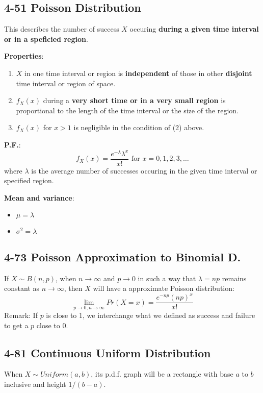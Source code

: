 \documentclass[12pt,landscape]{article}
\begin{document}
\begin{multicols}{3}
    \subsection{4-51 Poisson Distribution}
    This describes the number of success $X$ occuring \textbf{during a given time interval or in a speficied region}.

    \textbf{Properties}:
    \begin{enumerate}
        \item $X$ in one time interval or region is \textbf{independent} of those in other \textbf{disjoint} time
            interval or region of space.
        \item $f_X(x)$ during a \textbf{very short time or in a very small region} is proportional to the length
            of the time interval or the size of the region.
        \item $f_X(x)$ for $x > 1$ is negligible in the condition of (2) above.
    \end{enumerate}

    \textbf{P.F.}:
        $$ f_X(x) = \frac{e^{-\lambda}\lambda^x}{x!} \text{ for } x = 0, 1, 2, 3, \dots $$
    where $\lambda$ is the average number of successes occuring in the given time interval or specified region.

    \textbf{Mean and variance}:
    \begin{itemize}
        \item $\mu = \lambda$
        \item $\sigma^2 = \lambda$
    \end{itemize}

    \subsection{4-73 Poisson Approximation to Binomial D.}
    If $X \sim B(n, p)$, when $n \to \infty$ and $p \to 0$ in such a way that $\lambda = np$ remains
    constant as $n \to \infty$, then $X$ will have a approximate Poisson distribution:
        $$ \lim_{p \to 0, n \to \infty} Pr(X = x) = \frac{e^{-np}(np)^x}{x!} $$
    Remark: If $p$ is close to 1, we interchange what we defined as success and failure to get a $p$ close to 0.

    \subsection{4-81 Continuous Uniform Distribution}
    When $X \sim Uniform(a, b)$, its p.d.f. graph will be a rectangle with base $a$ to $b$ inclusive and height $1/(b-a)$.


\end{multicols}
\end{document}
